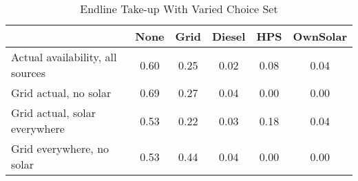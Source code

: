 \begin{table}[htbp]\centering
\caption{Endline Take-up With Varied Choice Set\label {tab1}}
\begin{tabular}{l*{5}{c}}
\toprule
            &        None&        Grid&      Diesel&         HPS&    OwnSolar\\
\midrule
Actual availability, all sources&        0.60&        0.25&        0.02&        0.08&        0.04\\
Grid actual, no solar&        0.69&        0.27&        0.04&        0.00&        0.00\\
Grid actual, solar everywhere&        0.53&        0.22&        0.03&        0.18&        0.04\\
Grid everywhere, no solar&        0.53&        0.44&        0.04&        0.00&        0.00\\
\bottomrule
\end{tabular}
\end{table}
